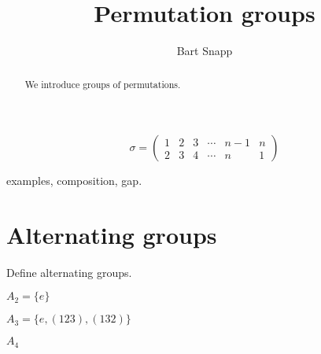 \documentclass{ximera}
\author{Bart Snapp}
\title{Permutation groups}
\begin{document}
\begin{abstract}
  We introduce groups of permutations. 
\end{abstract}
\maketitle


\[
  \sigma = \left(\begin{smallmatrix}
    1 & 2 & 3 & \cdots & n-1 & n \\
    2 & 3 & 4 & \cdots &  n  & 1
  \end{smallmatrix}\right)
\]


examples, composition, gap.

\section{Alternating groups}

Define alternating groups.

$A_2 = \{e\}$

$A_3 = \{e,(123), (132)\}$


$A_4$
\end{document}
